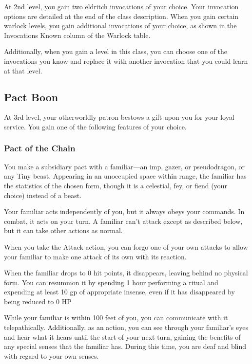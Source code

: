 At 2nd level, you gain two eldritch invocations of your choice. Your invocation options are detailed at the end of the class description. When you gain certain warlock levels, you gain additional invocations of your choice, as shown in the Invocations Known column of the Warlock table.

Additionally, when you gain a level in this class, you can choose one of the invocations you know and replace it with another invocation that you could learn at that level.

\subsection{Pact Boon}

At 3rd level, your otherworldly patron bestows a gift upon you for your loyal service. You gain one of the following features of your choice.

\subsubsection{Pact of the Chain}

You make a subsidiary pact with a familiar---an imp, gazer, or pseudodragon, or any Tiny beast. Appearing in an unoccupied space within range, the familiar has the statistics of the chosen form, though it is a celestial, fey, or fiend (your choice) instead of a beast.

Your familiar acts independently of you, but it always obeys your commands. In combat, it acts on your turn. A familiar can't attack except as described below, but it can take other actions as normal.

When you take the Attack action, you can forgo one of your own attacks to allow your familiar to make one attack of its own with its reaction.
    
When the familiar drops to 0 hit points, it disappears, leaving behind no physical form. You can resummon it by spending 1 hour performing a ritual and expending at least 10 gp of appropriate insense, even if it has disappeared by being reduced to 0 HP
    
While your familiar is within 100 feet of you, you can communicate with it telepathically. Additionally, as an action, you can see through your familiar's eyes and hear what it hears until the start of your next turn, gaining the benefits of any special senses that the familiar has. During this time, you are deaf and blind with regard to your own senses.
    
